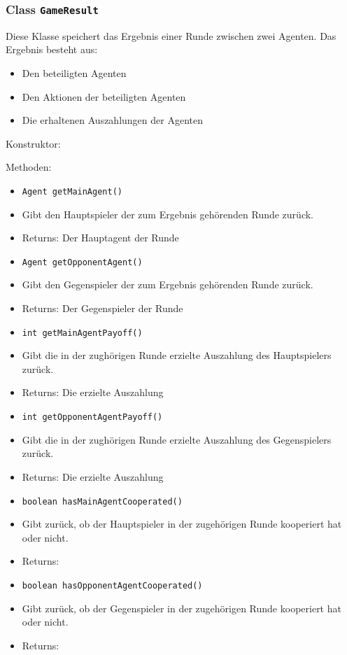 \documentclass[parskip=full,11pt]{scrartcl}
\begin{document}
\subsubsection{Class \texttt{GameResult}}

Diese Klasse speichert das Ergebnis einer Runde zwischen zwei Agenten. Das Ergebnis besteht aus:
\begin{itemize}\itemsep -10pt
	\item Den beteiligten Agenten
	\item Den Aktionen der beteiligten Agenten
	\item Die erhaltenen Auszahlungen der Agenten
\end{itemize}
	
Konstruktor:

Methoden:
\begin{itemize}\itemsep -10pt
	\item \texttt{Agent getMainAgent()}
	\item[]Gibt den Hauptspieler der zum Ergebnis gehörenden Runde zurück.
	\item[]Returns: Der Hauptagent der Runde
	\item \texttt{Agent getOpponentAgent()}
	\item[]Gibt den Gegenspieler der zum Ergebnis gehörenden Runde zurück.
	\item[]Returns: Der Gegenspieler der Runde
	\item \texttt{int getMainAgentPayoff()}
	\item[] Gibt die in der zughörigen Runde erzielte Auszahlung des Hauptspielers zurück.
	\item[]Returns: Die erzielte Auszahlung
	\item \texttt{int getOpponentAgentPayoff()}
	\item[] Gibt die in der zughörigen Runde erzielte Auszahlung des Gegenspielers zurück.
	\item[]Returns: Die erzielte Auszahlung
	\item \texttt{boolean hasMainAgentCooperated()}
	\item[]Gibt zurück, ob der Hauptspieler in der zugehörigen Runde kooperiert hat oder nicht.
	\item[]Returns: 
	\item \texttt{boolean hasOpponentAgentCooperated()}
	\item[]Gibt zurück, ob der Gegenspieler in der zugehörigen Runde kooperiert hat oder nicht.
	\item[]Returns: 
\end{itemize}
\end{document}
